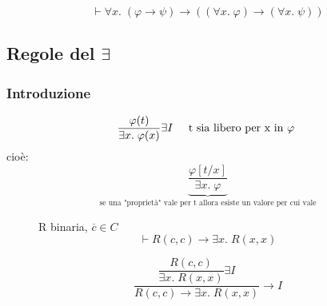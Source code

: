 \documentclass{article}
\theoremstyle{break}
\theoremstyle{break}
\theoremstyle{break}
\theoremstyle{break}
\begin{document}
\begin{figure}[H]
  \begin{exercise}
    \[
      \vdash \forall x.\; (\varphi \to \psi) \to ((\forall x.\; \varphi) \to (\forall x.\; \psi))
    \] 
    \begin{center}
      \large
    \end{center}
  \end{exercise}
\end{figure}

\subsection{Regole del \texorpdfstring{\( \exists  \)}{Esiste}}
\subsubsection{Introduzione}
\[
  \frac{\varphi(t)}{\exists x.\; \varphi(x)} \exists I \;\;\;\;\; \text{t sia libero per x in \( \varphi \) }
\] 
cioè:
\[
  \underbrace{\frac{\varphi[t/x]}{\exists x.\; \varphi}}_{\text{se una "proprietà" vale per t allora
  esiste un valore per cui vale}}
\] 

\begin{figure}[H]
  \begin{example}
    R binaria, \( \overline{c} \in C \) 
    \[
      \vdash R(c,c) \to \exists x.\; R(x,x)
    \] 

    \[
      \dfrac{\dfrac{R(c,c)}{\exists x.\; R(x,x)} \exists I}{R(c,c) \to \exists x.\; R(x,x)} \to I
    \] 
  \end{example}

\end{figure}
\end{document}
